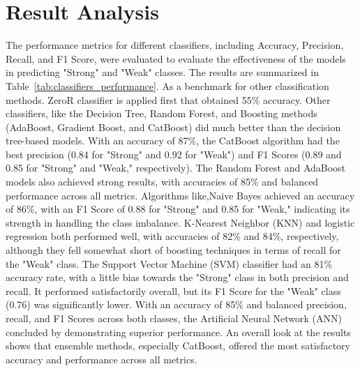 \documentclass[pt]{article}  %
\begin{document}
\section{Result Analysis}
The performance metrics for different classifiers, including Accuracy, Precision, Recall, and F1 Score, were evaluated to evaluate the effectiveness of the models in predicting "Strong" and "Weak" classes. The results are summarized in Table~\ref{tab:classifiers_performance}. As a benchmark for other classification methods. ZeroR classifier is applied first that obtained 55\% accuracy. Other classifiers, like the Decision Tree, Random Forest, and Boosting methods (AdaBoost, Gradient Boost, and CatBoost) did much better than the decision tree-based models. With an accuracy of 87\%, the CatBoost algorithm had the best precision (0.84 for "Strong" and 0.92 for "Weak") and F1 Scores (0.89 and 0.85 for "Strong" and "Weak," respectively). The Random Forest and AdaBoost models also achieved strong results, with accuracies of 85\% and balanced performance across all metrics. Algorithms like,Naive Bayes achieved an accuracy of 86\%, with an F1 Score of 0.88 for "Strong" and 0.85 for "Weak," indicating its strength in handling the class imbalance. K-Nearest Neighbor (KNN) and logistic regression both performed well, with accuracies of 82\% and 84\%, respectively, although they fell somewhat short of boosting techniques in terms of recall for the "Weak" class. The Support Vector Machine (SVM) classifier had an 81\% accuracy rate, with a little bias towards the "Strong" class in both precision and recall. It performed satisfactorily overall, but its F1 Score for the "Weak" class (0.76) was significantly lower. With an accuracy of 85\% and balanced precision, recall, and F1 Scores across both classes, the Artificial Neural Network (ANN) concluded by demonstrating superior performance. An overall look at the results shows that ensemble methods, especially CatBoost, offered the most satisfactory accuracy and performance across all metrics. 
\end{document}
